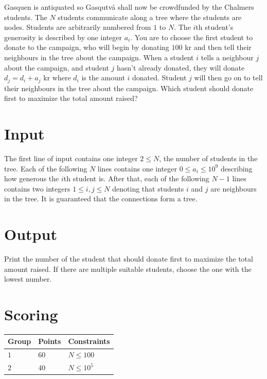 
Gasquen is antiquated so Gasqutvå shall now be crowdfunded by the Chalmers students.
The $N$ students communicate along a tree where the students are nodes. Students are arbitrarily numbered from $1$ to $N$.
The $i$th student's generosity is described by one integer $a_i$.
You are to choose the first student to donate to the campaign, who will begin by donating $100$ kr and then tell their neighbours in the tree about the campaign.
When a student $i$ tells a neighbour $j$ about the campaign, and student $j$ hasn't already donated, they will donate $d_j=d_i+a_j$ kr where $d_i$ is the amount $i$ donated.
Student $j$ will then go on to tell their neighbours in the tree about the campaign.
Which student should donate first to maximize the total amount raised?

\section*{Input}

The first line of input contains one integer $2 \leq N$, the number of students in the tree.
Each of the following $N$ lines contains one integer $0 \leq a_i \leq 10^9$ describing how generous the $i$th student is.
After that, each of the following $N-1$ lines contains two integers $1\leq i, j \leq N$ denoting that students $i$ and $j$ are neighbours in the tree.
It is guaranteed that the connections form a tree.

\section*{Output}

Print the number of the student that should donate first to maximize the total amount raised. If there are multiple suitable students, choose the one with the lowest number.

\section*{Scoring}

\noindent
\begin{tabular}{| l | l | l |}
\hline
Group & Points     & Constraints \\ \hline
$1$   & $60$       & $N \leq 100$ \\ \hline
$2$   & $40$       & $N \leq 10^5$ \\ \hline
\end{tabular}
